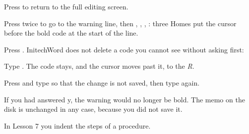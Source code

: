 \begin{WPSteps}
\item Press  to return to the full editing
screen.
\item Press  twice to go to the warning line, then
, , , : three
Homes put the cursor before the bold code at the start of the line.
\item Press .  InitechWord does not delete a code you cannot
see without asking first:
\end{WPSteps}
\begin{WPSteps}[resume]
\item Type .  The code stays, and the cursor moves past it, to the
\textit{R}.
\end{WPSteps}

\begin{WPSteps}[resume]
\item Press  and type  so that the change is not
saved, then type  again.
\end{WPSteps}
\EndReplay
\begin{Aside}If you had answered y, the warning would no longer be bold.  The
memo on the disk is unchanged in any case, because you did not save
it.\end{Aside}
In Lesson 7 you indent the steps of a procedure.
